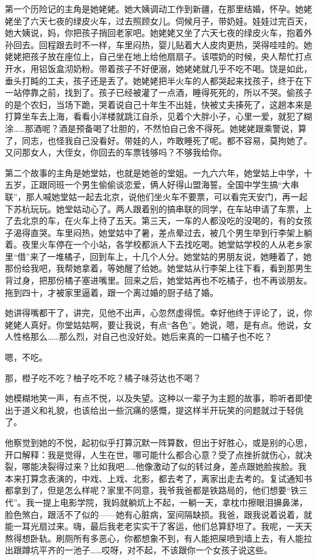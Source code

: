 \documentclass[lang=cn,newtx,12pt,scheme=chinese]{elegantbook}
\begin{document}
第一个历险记的主角是她姥姥。她大姨调动工作到新疆，在那里结婚，怀孕。她姥姥坐了六天七夜的绿皮火车，过去照顾女儿。伺候月子，带奶娃。娃娃过完百天，她大姨说，妈，你把孩子捎回老家吧。她姥姥又坐了六天七夜的绿皮火车，抱着外孙回去。回程跟去时不一样，车里闷热，婴儿贴着大人皮肉更热，哭得哇哇的。她姥姥把孩子放在座位上，自己坐在地上给他扇扇子。该喂奶的时候，央人帮忙打点开水，用铝饭盒沏奶粉。带着孩子不好便溺，她姥姥就几乎不吃不喝。饶是如此，垂头打盹的工夫，孩子还是丢了。她姥姥把半火车的人都哭起来找孩子，终于在下一站停靠之前，找到了。孩子已经被灌了一点酒，睡得死死的，所以不哭。偷孩子的是个农妇，当场下跪，哭着说自己十年生不出娃，快被丈夫揍死了，这趟本来是打算坐车去上海，看看小洋楼就跳江自杀，见着个大胖小子，心里一爱，就犯了糊涂……那酒呢？酒是预备喝了壮胆的，不然怕自己舍不得死。她姥姥跟乘警说，算了，同志，也怪我自己没看好。带娃的人，咋敢睡死了呢。都不容易，莫拘她了。又问那女人，大侄女，你回去的车票钱够吗？不够我给你。

第二个故事的主角是她堂姑，也就是她爸的堂姐。一九六六年，她堂姑上中学，十五岁，正跟同班一个男生偷偷谈恋爱，俩人好得山盟海誓。全国中学生搞“大串联”，那人喊她堂姑一起去北京，说他们坐火车不要票，可以看完天安门，再一起下苏杭玩玩。她堂姑动心了。两人跟着别的搞串联的同学，在车站申请了车票，上了去北京的车，在火车上待了五天。第三天，一车的人都没吃的没喝的，有的女孩子渴得直哭。车里闷热，她堂姑中了暑，差点晕过去，被几个男生举到行李架上躺着。夜里火车停在一个小站，各学校都派人下去找吃喝。她堂姑学校的人从老乡家里“借”来了一堆橘子，回到车上，十几个人分。她堂姑的男朋友说，她睡着了，她那份给我吧，我帮她拿着，等她醒了给她。她堂姑从行李架上往下看，看到那男生背过身，把那份橘子塞进嘴里。回来之后，她堂姑再也不吃橘子，也不再谈朋友。拖到四十，才被家里逼着，跟一个离过婚的厨子结了婚。

她讲得嘴都干了，讲完，见他不出声，心忽然虚得慌。幸好他终于评论了，说，你姥姥人真好。你堂姑姑啊，要让我说，有点“各色”。她说，嗯，是有点。他说，女人性格那么……那么烈，对自己也没好处。她后来真的一口橘子也不吃？

嗯，不吃。

那，橙子吃不吃？柚子吃不吃？橘子味芬达也不喝？

她模糊地笑一声，有点不悦，以及失望。这种以一辈子为主题的故事，聆听者即使出于道义和礼貌，也该给出一些沉痛的感慨，提这样半开玩笑的问题就过于轻佻了。

他察觉到她的不悦，起初似乎打算沉默一阵算数，但出于好胜心，或是别的心思，开口解释：我是觉得，人生在世，哪可能什么都合心意？受了点挫折就伤心，就决裂，哪能决裂得过来？比如我吧……他像激动了似的转过身，差点跟她脸挨脸。我本来打算念表演的，中戏、上戏、北影，都去考了，离家出走去考的。复试通知书都拿到了，但是怎么样呢？家里不同意，我爷我爸都是铁路局的，他们想要“铁三代”。我一提上电影学院，我妈就躺炕上不起，一躺一天，拿枕巾擦眼泪擤鼻涕，脸色煞白，跟活不了似的——她有心脏病，室间隔缺损。我爸，跟我说着说着，就能一耳光扇过来。嗨，最后我老老实实干了客运，他们总算舒坦了。我呢，一天天熬得想卧轨。刷厕所有多恶心，你都想象不到，有人能把屎喷到墙上去，有人能拉出跟蹲坑平齐的一池子……哎呀，对不起，不该跟你一个女孩子说这些。
\end{document}
